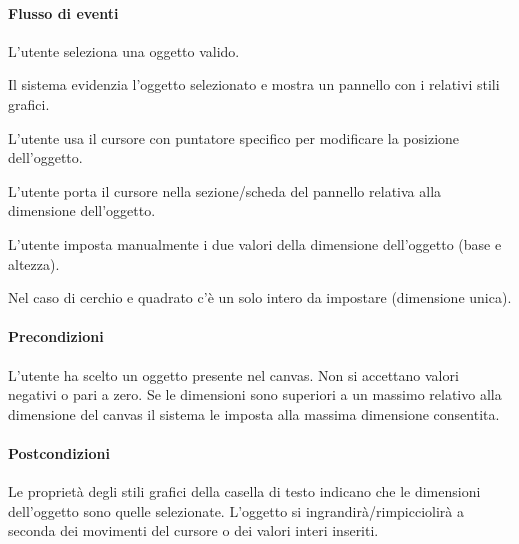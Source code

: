 \paragraph{Flusso di eventi}
\begin{elenconumerato}[\textbf{}]{\subsubsecindent}
\item  L'utente seleziona una oggetto valido.
\item  Il sistema evidenzia l'oggetto selezionato e mostra un pannello con i relativi stili grafici.
\item  L'utente usa il cursore con puntatore specifico per modificare la posizione dell'oggetto. 
\item  L'utente porta  il cursore nella sezione/scheda del pannello relativa alla dimensione dell'oggetto.
\item  L'utente imposta manualmente i due valori della dimensione dell'oggetto (base e altezza).
\item  Nel caso di cerchio e quadrato c'\` e un solo intero da impostare (dimensione unica).
\end{elenconumerato}
\paragraph{Precondizioni} L'utente ha scelto un oggetto presente nel canvas.
Non si accettano valori negativi o pari a zero. Se le dimensioni sono superiori a un massimo relativo alla dimensione del canvas il sistema le imposta alla massima dimensione consentita.
\paragraph{Postcondizioni} Le propriet\`a degli stili grafici della casella di testo indicano che le dimensioni dell'oggetto sono quelle selezionate. L'oggetto si ingrandir\` a/rimpicciolir\` a a seconda dei movimenti del cursore o dei valori interi inseriti.

